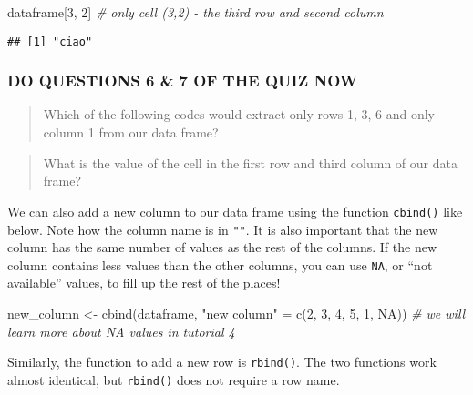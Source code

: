 \documentclass[
]{book}
\newenvironment{Shaded}{\begin{snugshade}}{\end{snugshade}}
\newcommand{\CommentTok}[1]{\textcolor[rgb]{0.56,0.35,0.01}{\textit{#1}}}
\newcommand{\ConstantTok}[1]{\textcolor[rgb]{0.00,0.00,0.00}{#1}}
\newcommand{\DecValTok}[1]{\textcolor[rgb]{0.00,0.00,0.81}{#1}}
\newcommand{\FunctionTok}[1]{\textcolor[rgb]{0.00,0.00,0.00}{#1}}
\newcommand{\NormalTok}[1]{#1}
\newcommand{\OtherTok}[1]{\textcolor[rgb]{0.56,0.35,0.01}{#1}}
\newcommand{\StringTok}[1]{\textcolor[rgb]{0.31,0.60,0.02}{#1}}
\begin{document}
\begin{Shaded}
\begin{Highlighting}[]
\NormalTok{dataframe[}\DecValTok{3}\NormalTok{, }\DecValTok{2}\NormalTok{] }\CommentTok{\# only cell (3,2) {-} the third row and second column}
\end{Highlighting}
\end{Shaded}

\begin{verbatim}
## [1] "ciao"
\end{verbatim}

\hypertarget{do-questions-6-7-of-the-quiz-now}{%
\subsubsection{DO QUESTIONS 6 \& 7 OF THE QUIZ NOW}\label{do-questions-6-7-of-the-quiz-now}}

\begin{quote}
Which of the following codes would extract only rows 1, 3, 6 and only column 1 from our data frame?
\end{quote}

\begin{quote}
What is the value of the cell in the first row and third column of our data frame?
\end{quote}

We can also add a new column to our data frame using the function \texttt{cbind()} like below. Note how the column name is in \texttt{""}. It is also important that the new column has the same number of values as the rest of the columns. If the new column contains less values than the other columns, you can use \texttt{NA}, or ``not available'' values, to fill up the rest of the places!

\begin{Shaded}
\begin{Highlighting}[]
\NormalTok{new\_column }\OtherTok{\textless{}{-}} \FunctionTok{cbind}\NormalTok{(dataframe, }\StringTok{"new column"} \OtherTok{=} \FunctionTok{c}\NormalTok{(}\DecValTok{2}\NormalTok{, }\DecValTok{3}\NormalTok{, }\DecValTok{4}\NormalTok{, }\DecValTok{5}\NormalTok{, }\DecValTok{1}\NormalTok{, }\ConstantTok{NA}\NormalTok{))}
    \CommentTok{\# we will learn more about NA values in tutorial 4}
\end{Highlighting}
\end{Shaded}

Similarly, the function to add a new row is \texttt{rbind()}. The two functions work almost identical, but \texttt{rbind()} does not require a row name.
\end{document}
